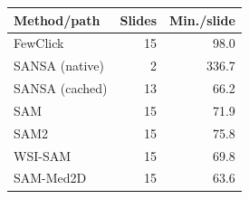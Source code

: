 \par\medskip\noindent\begin{minipage}{\linewidth}
\captionsetup{type=table}
\centering
\caption{Recorded end-to-end WSI workflow times under shared-GPU execution. Model loading and support preparation precede the timed interval. Target counts and concurrent GPU load vary.}
\label{tab:runtime}
\small
\setlength{\tabcolsep}{4pt}
\begin{tabular}{@{}lrr@{}}
\toprule
Method/path & Slides & Min./slide \\
\midrule
FewClick & 15 & 98.0 \\
SANSA (native) & 2 & 336.7 \\
SANSA (cached) & 13 & 66.2 \\
SAM & 15 & 71.9 \\
SAM2 & 15 & 75.8 \\
WSI-SAM & 15 & 69.8 \\
SAM-Med2D & 15 & 63.6 \\
\bottomrule
\end{tabular}
\end{minipage}\par\medskip
